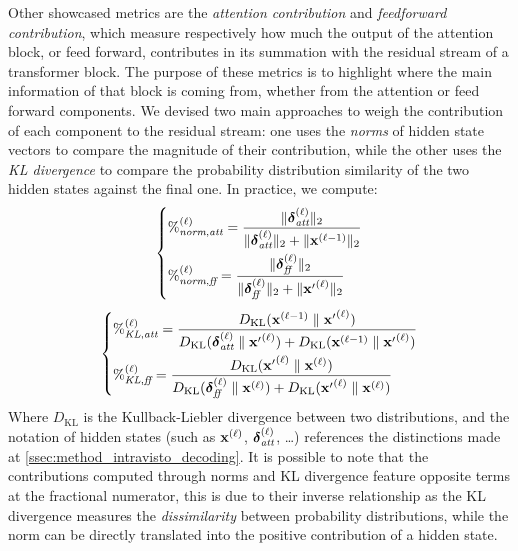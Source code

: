 Other showcased metrics are the \emph{attention contribution} and \emph{feedforward contribution}, which measure respectively how much the output of the attention block, or feed forward, contributes in its summation with the residual stream of a transformer block.
The purpose of these metrics is to highlight where the main information of that block is coming from, whether from the attention or feed forward components.
We devised two main approaches to weigh the contribution of each component to the residual stream: one uses the \emph{norms} of hidden state vectors to compare the magnitude of their contribution, while the other uses the \emph{KL divergence} to compare the probability distribution similarity of the two hidden states against the final one.
In practice, we compute:
\begin{equation}
    \left\{
    \begin{aligned}
        &{\%}^{(\ell)}_{\textit{norm},\textit{att}} = \frac{\|\bm{\mathbf{\delta}}_\textit{att}^{(\ell)}\|_2}{\|\bm{\mathbf{\delta}}_\textit{att}^{(\ell)}\|_2 + \|\bm{\mathbf{x}}^{(\ell-1)}\|_2} \\
        &{\%}^{(\ell)}_{\textit{norm},\textit{ff}} = \frac{\|\bm{\mathbf{\delta}}_\textit{ff}^{(\ell)}\|_2}{\|\bm{\mathbf{\delta}}_\textit{ff}^{(\ell)}\|_2 + \|{\bm{\mathbf{x}}'}^{(\ell)}\|_2} \label{eq:method_intravisto_norm-contrib}
    \end{aligned}
    \right.
\end{equation}
\begin{equation}
    \left\{
    \begin{aligned}
        &{\%}^{(\ell)}_{\textit{KL},\textit{att}} = \frac{D_{\text{KL}}(\bm{\mathbf{x}}^{(\ell-1)} \parallel {\bm{\mathbf{x}}'}^{(\ell)})}{D_{\text{KL}}(\bm{\mathbf{\delta}}_\textit{att}^{(\ell)} \parallel {\bm{\mathbf{x}}'}^{(\ell)}) + D_{\text{KL}}(\bm{\mathbf{x}}^{(\ell-1)} \parallel {\bm{\mathbf{x}}'}^{(\ell)})} \\
        &{\%}^{(\ell)}_{\textit{KL},\textit{ff}} = \frac{D_{\text{KL}}({\bm{\mathbf{x}}'}^{(\ell)} \parallel \bm{\mathbf{x}}^{(\ell)})}{D_{\text{KL}}(\bm{\mathbf{\delta}}_\textit{ff}^{(\ell)} \parallel \bm{\mathbf{x}}^{(\ell)}) + D_{\text{KL}}({\bm{\mathbf{x}}'}^{(\ell)} \parallel \bm{\mathbf{x}}^{(\ell)})} \label{eq:method_intravisto_kl-contrib}
    \end{aligned}
    \right.
\end{equation}
Where $D_{\text{KL}}$ is the Kullback-Liebler divergence between two distributions, and the notation of hidden states (such as $\bm{\mathbf{x}}^{(\ell)}$, $\bm{\mathbf{\delta}}_\textit{att}^{(\ell)}$, \ldots) references the distinctions made at \cref{ssec:method_intravisto_decoding}.
It is possible to note that the contributions computed through norms and KL divergence feature opposite terms at the fractional numerator, this is due to their inverse relationship as the KL divergence measures the \emph{dissimilarity} between probability distributions, while the norm can be directly translated into the positive contribution of a hidden state. 

